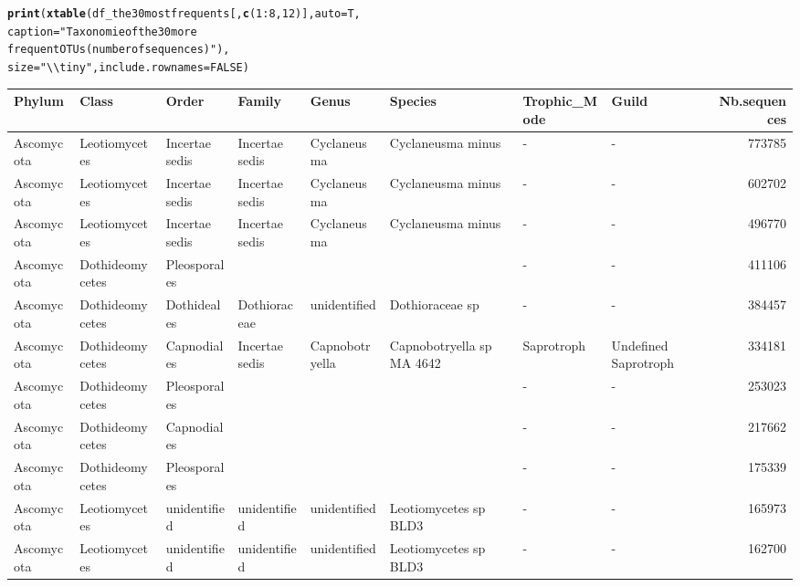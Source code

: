 \documentclass[12pt]{article}\usepackage[]{graphicx}\usepackage[]{color}
\makeatletter
\newcommand{\hlnum}[1]{\textcolor[rgb]{0.686,0.059,0.569}{#1}}%
\newcommand{\hlstr}[1]{\textcolor[rgb]{0.192,0.494,0.8}{#1}}%
\newcommand{\hlopt}[1]{\textcolor[rgb]{0,0,0}{#1}}%
\newcommand{\hlstd}[1]{\textcolor[rgb]{0.345,0.345,0.345}{#1}}%
\newcommand{\hlkwc}[1]{\textcolor[rgb]{0.333,0.667,0.333}{#1}}%
\newcommand{\hlkwd}[1]{\textcolor[rgb]{0.737,0.353,0.396}{\textbf{#1}}}%
\newenvironment{kframe}{%
 \def\at@end@of@kframe{}%
 \ifinner\ifhmode%
  \def\at@end@of@kframe{\end{minipage}}%
  \begin{minipage}{\columnwidth}%
 \fi\fi%
 \def\FrameCommand##1{\hskip\@totalleftmargin \hskip-\fboxsep
 \colorbox{shadecolor}{##1}\hskip-\fboxsep
     \hskip-\linewidth \hskip-\@totalleftmargin \hskip\columnwidth}%
 \MakeFramed {\advance\hsize-\width
   \@totalleftmargin\z@ \linewidth\hsize
   \@setminipage}}%
 {\par\unskip\endMakeFramed%
 \at@end@of@kframe}
\numberwithin{figure}{section}
\makeatother
\begin{document}
\begin{landscape}
\begin{kframe}
\begin{alltt}
\hlkwd{print}\hlstd{(}\hlkwd{xtable}\hlstd{(df_the30mostfrequents[,} \hlkwd{c}\hlstd{(}\hlnum{1}\hlopt{:}\hlnum{8}\hlstd{,} \hlnum{12}\hlstd{)],} \hlkwc{auto} \hlstd{= T,}
             \hlkwc{caption} \hlstd{=} \hlstr{"Taxonomie of the 30 more
             frequent OTUs (number of sequences)"}\hlstd{),}
      \hlkwc{size} \hlstd{=} \hlstr{"\textbackslash{}\textbackslash{}tiny"}\hlstd{,} \hlkwc{include.rownames} \hlstd{=} \hlnum{FALSE}\hlstd{)}
\end{alltt}
\end{kframe}%
\begin{table}[ht]
\centering
\begingroup\tiny
\begin{tabular}{llllllllr}
  \hline
Phylum & Class & Order & Family & Genus & Species & Trophic\_Mode & Guild & Nb.sequences \\ 
  \hline
Ascomycota & Leotiomycetes & Incertae sedis & Incertae sedis & Cyclaneusma & Cyclaneusma minus & - & - & 773785 \\ 
  Ascomycota & Leotiomycetes & Incertae sedis & Incertae sedis & Cyclaneusma & Cyclaneusma minus & - & - & 602702 \\ 
  Ascomycota & Leotiomycetes & Incertae sedis & Incertae sedis & Cyclaneusma & Cyclaneusma minus & - & - & 496770 \\ 
  Ascomycota & Dothideomycetes & Pleosporales &  &  &  & - & - & 411106 \\ 
  Ascomycota & Dothideomycetes & Dothideales & Dothioraceae & unidentified & Dothioraceae sp & - & - & 384457 \\ 
  Ascomycota & Dothideomycetes & Capnodiales & Incertae sedis & Capnobotryella & Capnobotryella sp MA 4642 & Saprotroph & Undefined Saprotroph & 334181 \\ 
  Ascomycota & Dothideomycetes & Pleosporales &  &  &  & - & - & 253023 \\ 
  Ascomycota & Dothideomycetes & Capnodiales &  &  &  & - & - & 217662 \\ 
  Ascomycota & Dothideomycetes & Pleosporales &  &  &  & - & - & 175339 \\ 
  Ascomycota & Leotiomycetes & unidentified & unidentified & unidentified & Leotiomycetes sp BLD3 & - & - & 165973 \\ 
  Ascomycota & Leotiomycetes & unidentified & unidentified & unidentified & Leotiomycetes sp BLD3 & - & - & 162700 \\ 

\end{tabular}
\end{table}
\end{landscape}
\end{document}
